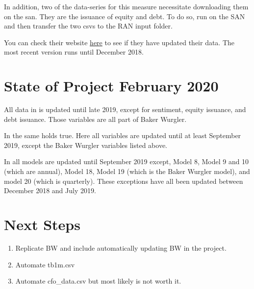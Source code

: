 \documentclass{article}
\begin{document}
	In addition, two of the data-series for this measure necessitate downloading them on the san. They are the issuance of equity and debt. To do so, run  on the SAN and then transfer the two csvs to the RAN input folder.
	
	You can check their website \href{http://people.stern.nyu.edu/jwurgler/}{here} to see if they have updated their data. The most recent version runs until December 2018. 
	
	\section{State of Project February 2020}
	
	All data in  is updated until late 2019, except for sentiment, equity issuance, and debt issuance. Those variables are all part of Baker Wurgler.  
	
	In  the same holds true. Here all variables are updated until at least September 2019, except the Baker Wurgler variables listed above. 
	
	In  all models are updated until September 2019 except, Model 8, Model 9 and 10 (which are annual), Model 18, Model 19 (which is the Baker Wurgler model), and model 20 (which is quarterly). These exceptions have all been updated between December 2018 and July 2019. 
	
	\section{Next Steps}
	\begin{enumerate}
		\item Replicate BW and include automatically updating BW in the project.
		\item Automate tb1m.csv
		\item Automate cfo\_data.csv but most likely is not worth it. 
	\end{enumerate}
	
	
\end{document}
